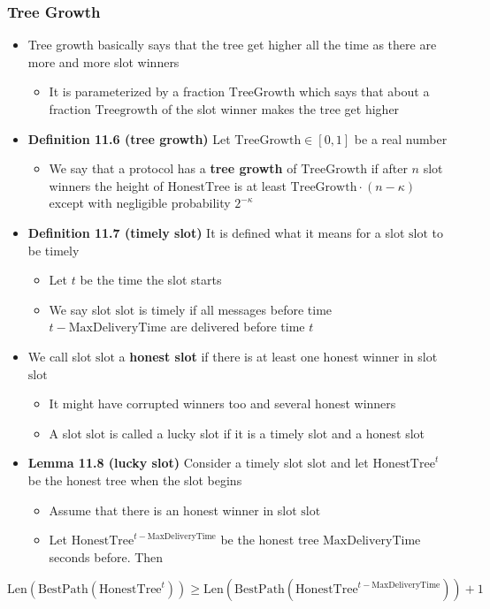 \documentclass[11pt]{article}
\begin{document}
\subsubsection{Tree Growth}
\label{sec:orgbe4e767}
\begin{itemize}
\item Tree growth basically says that the tree get higher all the time as there are more and more slot winners
\begin{itemize}
\item It is parameterized by a fraction \(\text{TreeGrowth}\) which says that about a fraction \(\text{Treegrowth}\) of the slot winner makes the tree get higher
\end{itemize}

\item \textbf{Definition 11.6 (tree growth)} Let \(\text{TreeGrowth} \in [0,1]\) be a real number
\begin{itemize}
\item We say that a protocol has a \textbf{tree growth} of \(\text{TreeGrowth}\) if after \(n\) slot winners the height of \(\text{HonestTree}\) is at least \(\text{TreeGrowth} \cdot (n-\kappa)\) except with negligible probability \(2^{-\kappa}\)
\end{itemize}

\item \textbf{Definition 11.7 (timely slot)} It is defined what it means for a slot \(\text{slot}\) to be timely
\begin{itemize}
\item Let \(t\) be the time the slot starts
\item We say slot \(\text{slot}\) is timely if all messages before time \(t-\text{MaxDeliveryTime}\) are delivered before time \(t\)
\end{itemize}

\item We call slot \(\text{slot}\) a \textbf{honest slot} if there is at least one honest winner in slot \(\text{slot}\)
\begin{itemize}
\item It might have corrupted winners too and several honest winners
\item A slot \(\text{slot}\) is called a lucky slot if it is a timely slot and a honest slot
\end{itemize}

\item \textbf{Lemma 11.8 (lucky slot)} Consider a timely slot \(\text{slot}\) and let \(\text{HonestTree}^t\) be the honest tree when the slot begins
\begin{itemize}
\item Assume that there is an honest winner in slot \(\text{slot}\)
\item Let \(\text{HonestTree}^{t-\text{MaxDeliveryTime}}\) be the honest tree \(\text{MaxDeliveryTime}\) seconds before. Then
\end{itemize}
\end{itemize}
\begin{equation}
  \text{Len}(\text{BestPath}(\text{HonestTree}^t)) \geq \text{Len}(\text{BestPath}(\text{HonestTree}^{t-\text{MaxDeliveryTime}})) + 1
\end{equation}
\end{document}
